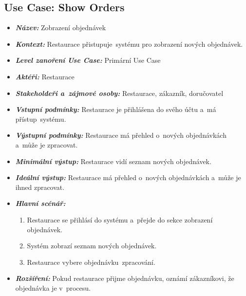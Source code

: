     \subsection{Use Case: Show Orders}
	\begin{itemize}[itemsep=0pt]
        \item \textbf{\textit{Název:}} Zobrazení objednávek
        \item \textbf{\textit{Kontext:}} Restaurace přistupuje~systému pro zobrazení nových objednávek.
        \item \textbf{\textit{Level zanoření Use Case:}} Primární Use Case
        \item \textbf{\textit{Aktéři:}} Restaurace
        \item \textbf{\textit{Stakeholdeři a~zájmové osoby:}} Restaurace, zákazník, doručovatel
        \item \textbf{\textit{Vstupní podmínky:}} Restaurace je přihlášena do svého účtu a~má přístup~systému.
        \item \textbf{\textit{Výstupní podmínky:}} Restaurace má přehled o~nových objednávkách a~může je zpracovat.
        \item \textbf{\textit{Minimální výstup:}} Restaurace vidí seznam nových objednávek.
        \item \textbf{\textit{Ideální výstup:}} Restaurace má přehled o~nových objednávkách a~může je ihned zpracovat.
        \item \textbf{\textit{Hlavní scénář:}}
			\begin{enumerate}[topsep=0pt]
            	\item Restaurace se přihlásí do systému a~přejde do sekce zobrazení objednávek.
            	\item Systém zobrazí seznam nových objednávek.
            	\item Restaurace vybere objednávku~zpracování.
			\end{enumerate}
        \item \textbf{\textit{Rozšíření:}} Pokud restaurace přijme objednávku, oznámí zákazníkovi, že objednávka je v~procesu.
	\end{itemize}

\pagebreak
